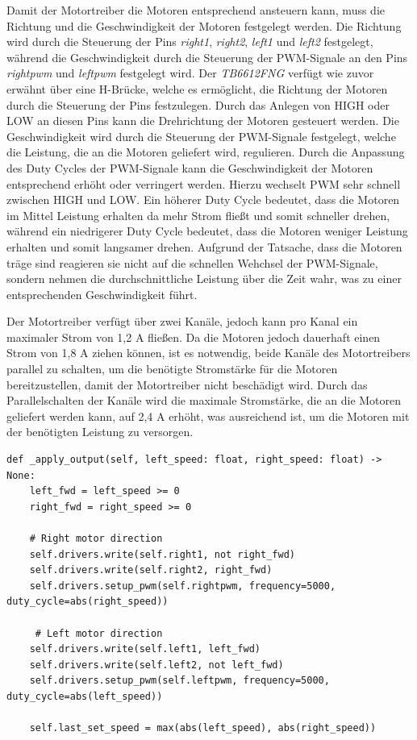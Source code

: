     Damit der Motortreiber die Motoren entsprechend ansteuern kann, muss die Richtung und die Geschwindigkeit der Motoren festgelegt werden. Die Richtung wird durch die Steuerung der Pins \emph{right1}, \emph{right2}, \emph{left1} und \emph{left2} festgelegt, während die Geschwindigkeit durch die Steuerung der \ac{PWM}-Signale an den Pins \emph{rightpwm} und \emph{leftpwm} festgelegt wird. Der \emph{TB6612FNG} verfügt wie zuvor erwähnt über eine H-Brücke, welche es ermöglicht, die Richtung der Motoren durch die Steuerung der Pins festzulegen. Durch das Anlegen von HIGH oder LOW an diesen Pins kann die Drehrichtung der Motoren gesteuert werden. Die Geschwindigkeit wird durch die Steuerung der \ac{PWM}-Signale festgelegt, welche die Leistung, die an die Motoren geliefert wird, regulieren. Durch die Anpassung des Duty Cycles der \ac{PWM}-Signale kann die Geschwindigkeit der Motoren entsprechend erhöht oder verringert werden. Hierzu wechselt \ac{PWM} sehr schnell zwischen HIGH und LOW. Ein höherer Duty Cycle bedeutet, dass die Motoren im Mittel Leistung erhalten da mehr Strom fließt und somit schneller drehen, während ein niedrigerer Duty Cycle bedeutet, dass die Motoren weniger Leistung erhalten und somit langsamer drehen. Aufgrund der Tatsache, dass die Motoren träge sind reagieren sie nicht auf die schnellen Wehchsel der \ac{PWM}-Signale, sondern nehmen die durchschnittliche Leistung über die Zeit wahr, was zu einer entsprechenden Geschwindigkeit führt.

    Der Motortreiber verfügt über zwei Kanäle, jedoch kann pro Kanal ein maximaler Strom von 1,2 A fließen. Da die Motoren jedoch dauerhaft einen Strom von 1,8 A ziehen können, ist es notwendig, beide Kanäle des Motortreibers parallel zu schalten, um die benötigte Stromstärke für die Motoren bereitzustellen, damit der Motortreiber nicht beschädigt wird. Durch das Parallelschalten der Kanäle wird die maximale Stromstärke, die an die Motoren geliefert werden kann, auf 2,4 A erhöht, was ausreichend ist, um die Motoren mit der benötigten Leistung zu versorgen.


    \begin{lstlisting}[caption={Funktion zur Ansteuerung der Motoren}, label={lst:apply_output}]
def _apply_output(self, left_speed: float, right_speed: float) -> None:
    left_fwd = left_speed >= 0
    right_fwd = right_speed >= 0

    # Right motor direction 
    self.drivers.write(self.right1, not right_fwd)
    self.drivers.write(self.right2, right_fwd)
    self.drivers.setup_pwm(self.rightpwm, frequency=5000, duty_cycle=abs(right_speed))

     # Left motor direction 
    self.drivers.write(self.left1, left_fwd)
    self.drivers.write(self.left2, not left_fwd)
    self.drivers.setup_pwm(self.leftpwm, frequency=5000, duty_cycle=abs(left_speed))

    self.last_set_speed = max(abs(left_speed), abs(right_speed))
    \end{lstlisting}
    

